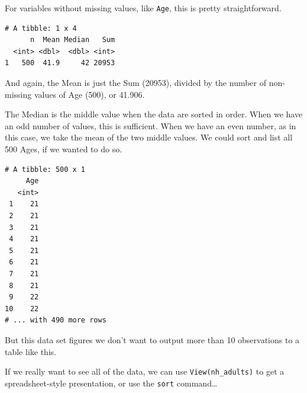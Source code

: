 \documentclass[
]{book}
\newenvironment{Shaded}{\begin{snugshade}}{\end{snugshade}}
\newcommand{\DataTypeTok}[1]{\textcolor[rgb]{0.13,0.29,0.53}{#1}}
\newcommand{\KeywordTok}[1]{\textcolor[rgb]{0.13,0.29,0.53}{\textbf{#1}}}
\newcommand{\NormalTok}[1]{#1}
\newcommand{\OperatorTok}[1]{\textcolor[rgb]{0.81,0.36,0.00}{\textbf{#1}}}
\newcommand{\StringTok}[1]{\textcolor[rgb]{0.31,0.60,0.02}{#1}}
\begin{document}
For variables without missing values, like \texttt{Age}, this is pretty straightforward.

\begin{Shaded}
\end{Shaded}

\begin{verbatim}
# A tibble: 1 x 4
      n  Mean Median   Sum
  <int> <dbl>  <dbl> <int>
1   500  41.9     42 20953
\end{verbatim}

And again, the Mean is just the Sum (20953), divided by the number of non-missing values of Age (500), or 41.906.

The Median is the middle value when the data are sorted in order. When we have an odd number of values, this is sufficient. When we have an even number, as in this case, we take the mean of the two middle values. We could sort and list all 500 Ages, if we wanted to do so.

\begin{Shaded}
\end{Shaded}

\begin{verbatim}
# A tibble: 500 x 1
     Age
   <int>
 1    21
 2    21
 3    21
 4    21
 5    21
 6    21
 7    21
 8    21
 9    22
10    22
# ... with 490 more rows
\end{verbatim}

But this data set figures we don't want to output more than 10 observations to a table like this.

If we really want to see all of the data, we can use \texttt{View(nh\_adults)} to get a spreadsheet-style presentation, or use the \texttt{sort} command\ldots{}

\begin{Shaded}
\end{Shaded}
\end{document}
